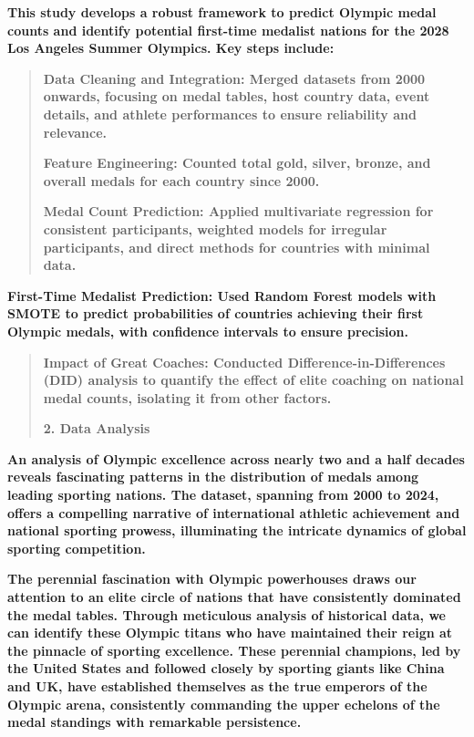 \documentclass[12pt,a4paper]{article}
\renewenvironment{quote}{\begin{quotation}}{\end{quotation}}  %
\begin{document}
    \textbf{This study develops a robust framework to predict Olympic medal
    counts and identify potential first-time medalist nations for the 2028
    Los Angeles Summer Olympics. Key steps include:}
    
    \begin{quote}
    \textbf{Data Cleaning and Integration: Merged datasets from 2000
    onwards, focusing on medal tables, host country data, event details, and
    athlete performances to ensure reliability and relevance.}
    
    \textbf{Feature Engineering: Counted total gold, silver, bronze, and
    overall medals for each country since 2000.}
    
    \textbf{Medal Count Prediction: Applied multivariate regression for
    consistent participants, weighted models for irregular participants, and
    direct methods for countries with minimal data.}
    \end{quote}
    
    \textbf{First-Time Medalist Prediction: Used Random Forest models with
    SMOTE to predict probabilities of countries achieving their first
    Olympic medals, with confidence intervals to ensure precision.}
    
    \begin{quote}
    \textbf{Impact of Great Coaches: Conducted Difference-in-Differences
    (DID) analysis to quantify the effect of elite coaching on national
    medal counts, isolating it from other factors.}
    
    \protect{}\label{bookmark6-1}{}\textbf{2. Data Analysis}
    \end{quote}
    
    \textbf{An analysis of Olympic excellence across nearly two and a half
    decades reveals fascinating patterns in the distribution of medals among
    leading sporting nations. The dataset, spanning from 2000 to 2024,
    offers a compelling narrative of international athletic achievement and
    national sporting prowess, illuminating the intricate dynamics of global
    sporting competition.}
    
    \textbf{The perennial fascination with Olympic powerhouses draws our
    attention to an elite circle of nations that have consistently dominated
    the medal tables. Through meticulous analysis of historical data, we can
    identify these Olympic titans who have maintained their reign at the
    pinnacle of sporting excellence. These perennial champions, led by the
    United States and followed closely by sporting giants like China and UK,
    have established themselves as the true emperors of the Olympic arena,
    consistently commanding the upper echelons of the medal standings with
    remarkable persistence.}
    
\end{document}
